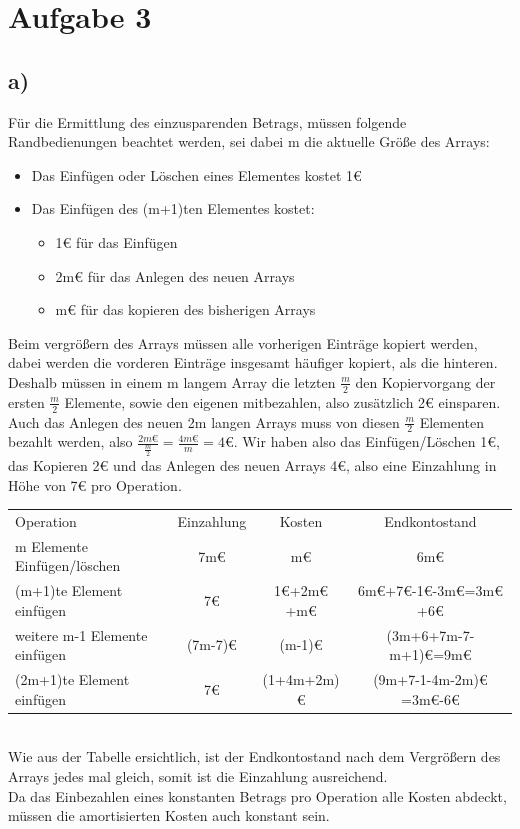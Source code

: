 \documentclass[a4paper,11pt,twoside]{article}
\begin{document}
\section*{Aufgabe 3}
\vspace{-10pt}
\subsection*{a)}
Für die Ermittlung des einzusparenden Betrags, müssen folgende Randbedienungen beachtet werden, sei dabei m die aktuelle Größe des Arrays:
\begin{itemize}
	\item Das Einfügen oder Löschen eines Elementes kostet 1€
	\item Das Einfügen des (m+1)ten Elementes kostet:
	\begin{itemize}
		\item 1€ für das Einfügen
		\item 2m€ für das Anlegen des neuen Arrays
		\item m€ für das kopieren des bisherigen Arrays
	\end{itemize}
\end{itemize}  
Beim vergrößern des Arrays müssen alle vorherigen Einträge kopiert werden, dabei werden die vorderen Einträge insgesamt häufiger kopiert, als die hinteren. Deshalb müssen in einem m langem Array die letzten $\frac{m}{2}$ den Kopiervorgang der ersten $\frac{m}{2}$ Elemente, sowie den eigenen mitbezahlen, also zusätzlich 2€ einsparen. Auch das Anlegen des neuen 2m langen Arrays muss von diesen $\frac{m}{2}$ Elementen bezahlt werden, also $\frac{2m€}{\frac{m}{2}}=\frac{4m€}{m}=4€$. Wir haben also das Einfügen/Löschen 1€, das Kopieren 2€ und das Anlegen des neuen Arrays 4€, also eine Einzahlung in Höhe von 7€ pro Operation.\\
\begin{tabular}{|l|c|c|c|}
	\hline
	Operation & Einzahlung & Kosten & Endkontostand \\
	m Elemente Einfügen/löschen & 7m€ & m€ & 6m€ \\
	(m+1)te Element einfügen & 7€ & 1€+2m€+m€ &6m€+7€-1€-3m€=3m€+6€ \\
	weitere m-1 Elemente einfügen & (7m-7)€ & (m-1)€ & (3m+6+7m-7-m+1)€=9m€ \\
	(2m+1)te Element einfügen & 7€ & (1+4m+2m)€ & (9m+7-1-4m-2m)€ =3m€-6€\\ \hline 
\end{tabular}\\
Wie aus der Tabelle ersichtlich, ist der Endkontostand nach dem Vergrößern des Arrays jedes mal gleich, somit ist die Einzahlung ausreichend.\\
Da das Einbezahlen eines konstanten Betrags pro Operation alle Kosten abdeckt, müssen die amortisierten Kosten auch konstant sein.
\vspace{-10pt}
\end{document}
